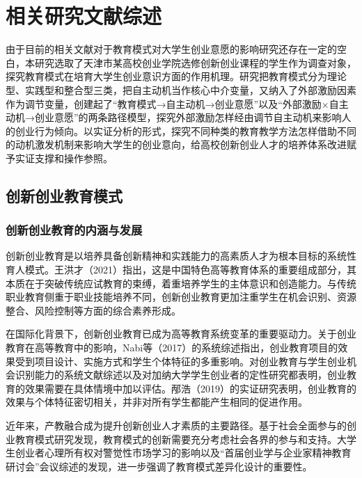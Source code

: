 \chapter{相关研究文献综述}

由于目前的相关文献对于教育模式对大学生创业意愿的影响研究还存在一定的空白，本研究选取了天津市某高校创业学院选修创新创业课程的学生作为调查对象，探究教育模式在培育大学生创业意识方面的作用机理。研究把教育模式分为理论型、实践型和整合型三类，把自主动机当作核心中介变量，又纳入了外部激励因素作为调节变量，创建起了\nolinebreak[3]“教育模式→自主动机→创业意愿”以及\nolinebreak[3]“外部激励×自主动机→创业意愿”的两条路径模型，探究外部激励怎样经由调节自主动机来影响人的创业行为倾向。以实证分析的形式，探究不同种类的教育教学方法怎样借助不同的动机激发机制来影响大学生的创业意向，给高校创新创业人才的培养体系改进赋予实证支撑和操作参照。

\section{创新创业教育模式}

\subsection{创新创业教育的内涵与发展}

创新创业教育是以培养具备创新精神和实践能力的高素质人才为根本目标的系统性育人模式。王洪才\nolinebreak[3]（2021）指出，这是中国特色高等教育体系的重要组成部分，其本质在于突破传统应试教育的束缚，着重培养学生的主体意识和创造能力\cite{wanghongcai2021}。与传统职业教育侧重于职业技能培养不同，创新创业教育更加注重学生在机会识别、资源整合、风险控制等方面的综合素养形成\cite{zhoudongmei2020}。

在国际化背景下，创新创业教育已成为高等教育系统变革的重要驱动力。关于创业教育在高等教育中的影响，Nabi等\nolinebreak[3]（2017）的系统综述指出，创业教育项目的效果受到项目设计、实施方式和学生个体特征的多重影响\cite{Nabi2017}。对创业教育与学生创业机会识别能力的系统文献综述\cite{EEP2025a}以及对加纳大学学生创业者的定性研究\cite{EEP2025b}都表明，创业教育的效果需要在具体情境中加以评估。邴浩\nolinebreak[3]（2019）的实证研究表明，创业教育的效果与个体特征密切相关，并非对所有学生都能产生相同的促进作用\cite{binghao2019}。

近年来，产教融合成为提升创新创业人才素质的主要路径。基于社会全面参与的创业教育模式研究\cite{guanlixuebao2011}发现，教育模式的创新需要充分考虑社会各界的参与和支持。大学生创业者心理所有权对警觉性市场学习的影响\cite{guanlixuebao2023}以及\nolinebreak[3]“首届创业学与企业家精神教育研讨会”会议综述\cite{nankai2003}的发现，进一步强调了教育模式差异化设计的重要性。

